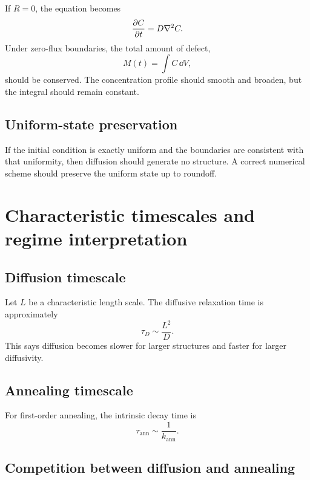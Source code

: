\documentclass[11pt]{article}
\begin{document}
If $R=0$, the equation becomes
\begin{equation}
\pdv{C}{t} = D\nabla^2 C.
\end{equation}
Under zero-flux boundaries, the total amount of defect,
\begin{equation}
M(t) = \int C\,\dd V,
\end{equation}
should be conserved. The concentration profile should smooth and broaden, but the integral should remain constant.

\subsection{Uniform-state preservation}

If the initial condition is exactly uniform and the boundaries are consistent with that uniformity, then diffusion should generate no structure. A correct numerical scheme should preserve the uniform state up to roundoff.

\section{Characteristic timescales and regime interpretation}

\subsection{Diffusion timescale}

Let $L$ be a characteristic length scale. The diffusive relaxation time is approximately
\begin{equation}
\tau_D \sim \frac{L^2}{D}.
\end{equation}
This says diffusion becomes slower for larger structures and faster for larger diffusivity.

\subsection{Annealing timescale}

For first-order annealing, the intrinsic decay time is
\begin{equation}
\tau_{\mathrm{ann}} \sim \frac{1}{k_{\mathrm{ann}}}.
\end{equation}

\subsection{Competition between diffusion and annealing}
\end{document}
